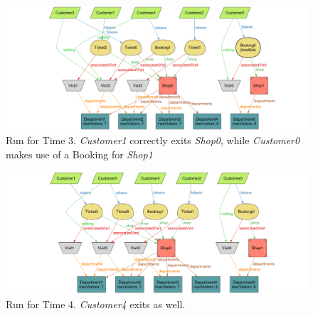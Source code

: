\begin{figure}[H]
    \centering
    \includegraphics[height=0.25\textheight]{Images/Alloy/5Customers_v1_t3.png}
    \caption{Run for Time 3. \emph{Customer1} correctly exits \emph{Shop0}, while \emph{Customer0} makes use of a Booking for \emph{Shop1}}
\end{figure}
\begin{figure}[H]
    \centering
    \includegraphics[height=0.25\textheight]{Images/Alloy/5Customers_v1_t4.png}
    \caption{Run for Time 4. \emph{Customer4} exits as well.}
\end{figure}

